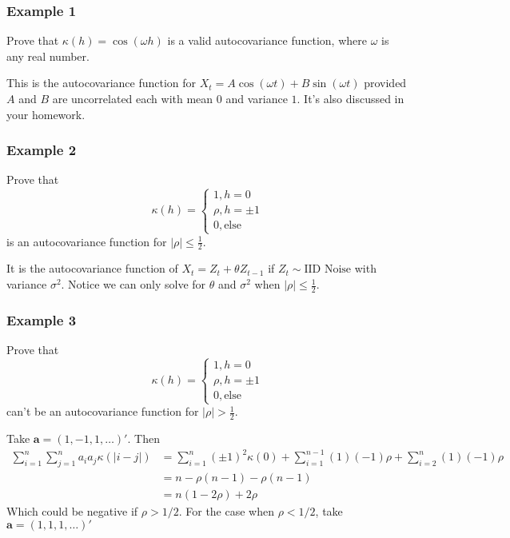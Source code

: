 \documentclass{beamer}
\begin{document}
\begin{frame}
\frametitle{Example 1}

Prove that $\kappa(h) = \cos(\omega h)$ is a valid autocovariance function, where $\omega$ is any real number.
\pause
\newline


This is the autocovariance function for $X_t = A \cos( \omega t ) + B \sin( \omega t)$ provided $A$ and $B$ are uncorrelated each with mean $0$ and variance $1$. It's also discussed in your homework.

\end{frame}


\begin{frame}
\frametitle{Example 2}

Prove that 
\[
\kappa(h) = 
\begin{cases}
1, h=0 \\
\rho, h=\pm1  \\
0, \text{else}
\end{cases}
\]
is an autocovariance function for $|\rho| \le \frac{1}{2}$.
\pause
\newline

It is the autocovariance function of $X_t = Z_t + \theta Z_{t-1}$ if $Z_t \sim \text{IID Noise}$ with variance $\sigma^2$. Notice we can only solve for $\theta$ and $\sigma^2$ when $|\rho| \le \frac{1}{2}$.
\end{frame}

\begin{frame}
\frametitle{Example 3}

Prove that 
\[
\kappa(h) = 
\begin{cases}
1, h=0 \\
\rho, h=\pm1  \\
0, \text{else}
\end{cases}
\]
can't be an autocovariance function for $|\rho| > \frac{1}{2}$.
\pause
\newline

Take $\mathbf{a} = (1,-1,1,\ldots)'$. Then 
\begin{align*}
\sum_{i=1}^n\sum_{j=1}^n a_i a_j \kappa(|i-j|) &= \sum_{i=1}^n (\pm 1)^2 \kappa(0) + \sum_{i=1}^{n-1}(1)(-1)\rho  + \sum_{i=2}^n(1)(-1) \rho \\
&= n - \rho(n-1) - \rho(n-1) \\
&= n(1-2\rho) + 2\rho
\end{align*}
Which could be negative if $\rho > 1/2$. For the case when $\rho < 1/2$, take $\mathbf{a} = (1,1,1,\ldots)'$

\end{frame}
\end{document}
